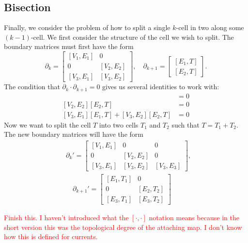 \documentclass[twocolumn]{article}
\begin{document}
\subsection{Bisection}

Finally, we consider the problem of how to split a single $k$-cell in two along some $(k - 1)$-cell.
We first consider the structure of the cell we wish to split.
The boundary matrices must first have the form
\begin{equation}
    \partial_k = \left[\begin{matrix}[V_1, E_1] & 0 \\ 0 & [V_2, E_2] \\ [V_3, E_1] & [V_3, E_2]\end{matrix}\right], \quad \partial_{k + 1} = \left[\begin{matrix}[E_1, T] \\ [E_2, T]\end{matrix}\right].
\end{equation}
The condition that $\partial_k\cdot\partial_{k + 1} = 0$ gives us several identities to work with:
\begin{align}
    [V_1, E_1][E_1, T] & = 0 \\
    [V_2, E_2][E_2, T] & = 0 \\
    [V_3, E_1][E_1, T] + [V_3, E_2][E_2, T] & = 0
\end{align}
Now we want to split the cell $T$ into two cells $T_1$ and $T_2$ such that $T = T_1 + T_2$.
The new boundary matrices will have the form
\begin{align}
    & \partial_k' = \left[\begin{matrix}[V_1, E_1] & 0 & 0 \\ 0 & [V_2, E_2] & 0 \\ [V_3, E_1] & [V_3, E_2] & [V_3, E_3] \end{matrix}\right], \\
    & \quad \partial_{k + 1}' = \left[\begin{matrix}[E_1, T_1] & 0 \\ 0 & [E_2, T_2] \\ [E_3, T_1] & [E_3, T_2]\end{matrix}\right]
\end{align}

\textcolor{red}{Finish this.
I haven't introduced what the $[\cdot,\cdot]$ notation means because in the short version this was the topological degree of the attaching map.
I don't know how this is defined for currents.}
\end{document}
